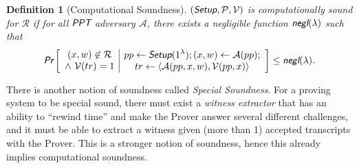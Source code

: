 \documentclass{article}
\newtheorem{definition}{Definition}[section]
\begin{document}
\begin{definition}[Computational Soundness]
$(\emph{\textsf{Setup}}, \mathcal{P}, \mathcal{V})$ is computationally sound for $\mathcal{R}$ if for all $\emph{\textsf{PPT}}$ adversary $\mathcal{A}$, there exists a negligible function $\emph{\textsf{negl}}(\lambda)$ such that
\begin{align*}
\emph{\textsf{Pr}}\left[
\begin{array}{c|c}
    \begin{gathered}
        (x,w)\not\in\mathcal{R}\\
        \wedge\ \mathcal{V}(tr) = 1
    \end{gathered}
    &
    \begin{gathered}
        pp\leftarrow\emph{\textsf{Setup}}(1^{\lambda}); (x, w)\leftarrow\mathcal{A}(pp); \\
        tr\leftarrow\langle\mathcal{A}(pp,x,w), \mathcal{V}(pp,x)\rangle
    \end{gathered}
\end{array}
\right]
\le \emph{\textsf{negl}}(\lambda).
\end{align*}
\end{definition}

There is another notion of soundness called \textit{Special Soundness}. For a proving system to be special sound, there must exist a \textit{witness extractor} that has an ability to ``rewind time'' and make the Prover answer several different challenges, and it must be able to extract a witness given (more than 1) accepted transcripts with the Prover. This is a stronger notion of soundness, hence this already implies computational soundness.
\end{document}

